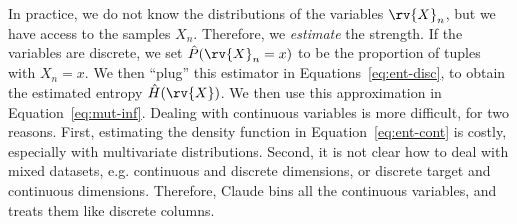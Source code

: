 In practice, we do not know the distributions of the variables $\rv{X}_n$, but
we have access to the samples $X_n$. Therefore, we \emph{estimate} the
strength. If the variables are discrete, we set $\hat{P}(\rv{X}_n = x)$ to be
the proportion of tuples with $X_n=x$. We then ``plug'' this estimator in
Equations~\ref{eq:ent-disc}, to obtain the estimated entropy $\hat{H}(\rv{X})$.
We then use this approximation in Equation~\ref{eq:mut-inf}.  Dealing with
continuous variables is more difficult, for two reasons. First, estimating the
density function in Equation~\ref{eq:ent-cont} is costly, especially with
multivariate distributions.  Second, it is not clear how to deal with mixed
datasets, e.g.  continuous and discrete dimensions, or discrete target and
continuous dimensions.  Therefore, Claude bins all the continuous variables,
and treats them like discrete columns.

